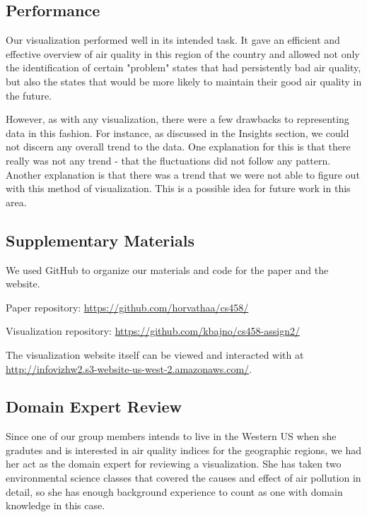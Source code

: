 \documentclass[journal]{vgtc}                %
\begin{document}
\subsection{Performance}

Our visualization performed well in its intended task. It gave an efficient and effective overview of air quality in this 
region of the country and allowed not only the identification of certain "problem" states that had persistently bad
air quality, but also the states that would be more likely to maintain their good air quality in the future.

However, as with any visualization, there were a few drawbacks to representing data in this fashion. For instance, as discussed
in the Insights section, we could not discern any overall trend to the data. One explanation for this is that there really was
not any trend - that the fluctuations did not follow any pattern. Another explanation is that there was a trend that we were not
able to figure out with this method of visualization. This is a possible idea for future work in this area. 

\subsection{Supplementary Materials}

We used GitHub to organize our materials and code for the paper and the website. 

Paper repository: \url{https://github.com/horvathaa/cs458/}

Visualization repository: \url{https://github.com/kbajno/cs458-assign2/}

The visualization website itself can be viewed and interacted with at 
\url{http://infovizhw2.s3-website-us-west-2.amazonaws.com/}.


\subsection{Domain Expert Review}

Since one of our group members intends to live in the Western US when she gradutes and 
is interested in air quality indices for the geographic regions, we had her act as the 
domain expert for reviewing a visualization. She has taken two environmental science 
classes that covered the causes and effect of air pollution in detail, so she has
enough background experience to count as one with domain knowledge in this case.
\end{document}
